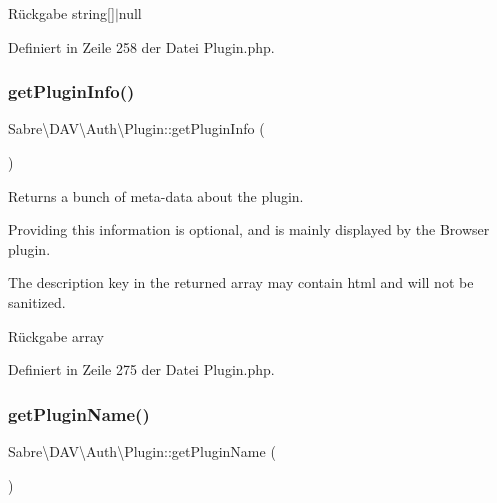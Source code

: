 \begin{DoxyReturn}{Rückgabe}
string\mbox{[}\mbox{]}$\vert$null 
\end{DoxyReturn}


Definiert in Zeile 258 der Datei Plugin.\+php.

\mbox{\label{class_sabre_1_1_d_a_v_1_1_auth_1_1_plugin_a814681021297509c4bdd0d6fa8578960}} 
\subsubsection{\texorpdfstring{get\+Plugin\+Info()}{getPluginInfo()}}
{\footnotesize\ttfamily Sabre\textbackslash{}\+D\+A\+V\textbackslash{}\+Auth\textbackslash{}\+Plugin\+::get\+Plugin\+Info (\begin{DoxyParamCaption}{ }\end{DoxyParamCaption})}

Returns a bunch of meta-\/data about the plugin.

Providing this information is optional, and is mainly displayed by the Browser plugin.

The description key in the returned array may contain html and will not be sanitized.

\begin{DoxyReturn}{Rückgabe}
array 
\end{DoxyReturn}


Definiert in Zeile 275 der Datei Plugin.\+php.

\mbox{\label{class_sabre_1_1_d_a_v_1_1_auth_1_1_plugin_a903a5c08cd4ed94be8469c5f872b6f65}} 
\subsubsection{\texorpdfstring{get\+Plugin\+Name()}{getPluginName()}}
{\footnotesize\ttfamily Sabre\textbackslash{}\+D\+A\+V\textbackslash{}\+Auth\textbackslash{}\+Plugin\+::get\+Plugin\+Name (\begin{DoxyParamCaption}{ }\end{DoxyParamCaption})}


